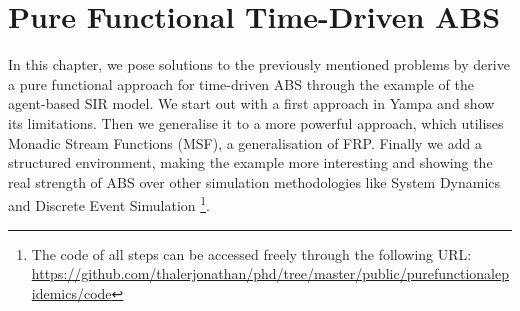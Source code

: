 \chapter{Pure Functional Time-Driven ABS}
\label{ch:timedriven}

In this chapter, we pose solutions to the previously mentioned problems by derive a pure functional approach for time-driven ABS through the example of the agent-based SIR model. We start out with a first approach in Yampa and show its limitations. Then we generalise it to a more powerful approach, which utilises Monadic Stream Functions (MSF), a generalisation of FRP. Finally we add a structured environment, making the example more interesting and showing the real strength of ABS over other simulation methodologies like System Dynamics and Discrete Event Simulation \footnote{The code of all steps can be accessed freely through the following URL: \url{https://github.com/thalerjonathan/phd/tree/master/public/purefunctionalepidemics/code}}.









